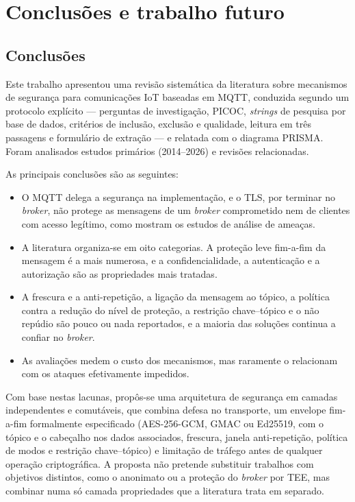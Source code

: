 \section{Conclusões e trabalho futuro}
\label{sec:conclusoes}

\subsection{Conclusões}

Este trabalho apresentou uma revisão sistemática da literatura sobre mecanismos de
segurança para comunicações IoT baseadas em MQTT, conduzida segundo um protocolo
explícito --- perguntas de investigação, PICOC, \emph{strings} de pesquisa por base
de dados, critérios de inclusão, exclusão e qualidade, leitura em três passagens e
formulário de extração --- e relatada com o diagrama PRISMA. Foram analisados
\nIncluidos{} estudos primários (2014--2026) e \nSecundarios{} revisões
relacionadas.

As principais conclusões são as seguintes:

\begin{itemize}[leftmargin=*]
  \item O MQTT delega a segurança na implementação, e o TLS, por terminar no
    \emph{broker}, não protege as mensagens de um \emph{broker} comprometido nem de
    clientes com acesso legítimo, como mostram os estudos de análise de ameaças.
  \item A literatura organiza-se em oito categorias. A proteção leve fim-a-fim da
    mensagem é a mais numerosa, e a confidencialidade, a autenticação e a
    autorização são as propriedades mais tratadas.
  \item A frescura e a anti-repetição, a ligação da mensagem ao tópico, a política
    contra a redução do nível de proteção, a restrição chave--tópico e o não repúdio
    são pouco ou nada reportados, e a maioria das soluções continua a confiar no
    \emph{broker}.
  \item As avaliações medem o custo dos mecanismos, mas raramente o relacionam com
    os ataques efetivamente impedidos.
\end{itemize}

Com base nestas lacunas, propôs-se uma arquitetura de segurança em camadas
independentes e comutáveis, que combina defesa no transporte, um envelope fim-a-fim
formalmente especificado (AES-256-GCM, GMAC ou Ed25519, com o tópico e o cabeçalho
nos dados associados, frescura, janela anti-repetição, política de modos e
restrição chave--tópico) e limitação de tráfego antes de qualquer operação
criptográfica. A proposta não pretende substituir trabalhos com objetivos distintos,
como o anonimato ou a proteção do \emph{broker} por TEE, mas combinar numa só
camada propriedades que a literatura trata em separado.

